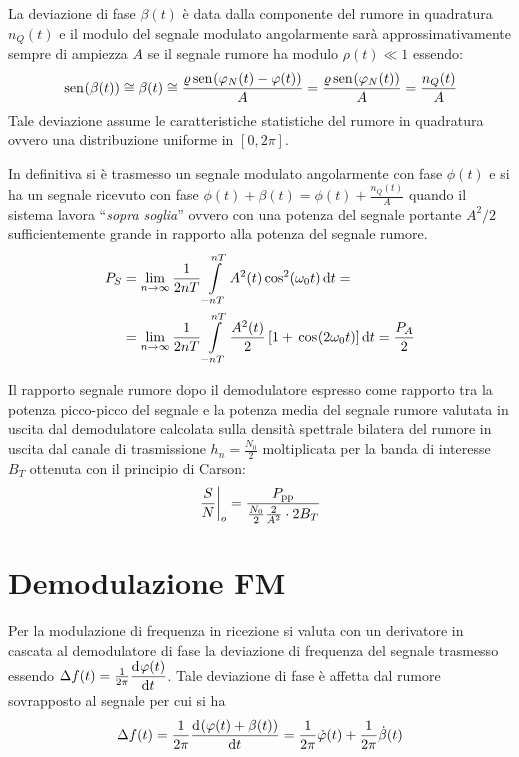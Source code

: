 La deviazione di fase $\beta(t)$ è data dalla componente del rumore in quadratura $n_Q(t)$ e il modulo del segnale modulato angolarmente sarà approssimativamente sempre di ampiezza $A$ se il segnale rumore ha modulo $\rho(t)\ll 1$ essendo:
\[\sen{\beta(t)}\cong\beta(t)\cong\frac{\rho\sen{\phi_N(t)-\phi(t)}}{A}=\frac{\rho\sen{\phi_N(t)}}{A}=\frac{n_Q(t)}{A}\]
Tale deviazione assume le caratteristiche statistiche del rumore in quadratura ovvero una distribuzione uniforme in $[0,2\pi]$.

In definitiva si è trasmesso un segnale modulato angolarmente con fase $\phi(t)$ e si ha un segnale ricevuto con fase $\phi(t)+\beta(t)=\phi(t)+\tfrac{n_Q(t)}{A}$ quando il sistema lavora “\emph{sopra soglia}” ovvero con una potenza del segnale portante $A^2/2$ sufficientemente grande in rapporto alla potenza del segnale rumore.
\begin{equation}\begin{split}
P_S&=\lim\limits_{n\to\infty}{\frac{1}{2 n T}\intd{-n T}{n T}{A^2(t)\cos[2]{\omega_0 t}}{t}}=\\
&=\lim\limits_{n\to\infty}{\frac{1}{2 n T}\intd{-n T}{n T}{\frac{A^2(t)}{2}\left[1+\cos{2\omega_0 t}\right]}{t}}=\frac{P_A}{2}
\end{split}\end{equation}

Il rapporto segnale rumore dopo il demodulatore espresso come rapporto tra la potenza picco-picco del segnale e la potenza media del segnale rumore valutata in uscita dal demodulatore calcolata sulla densità spettrale bilatera del rumore in uscita dal canale di trasmissione $h_n=\frac{N_0}{2}$ moltiplicata per la banda di interesse $B_T$ ottenuta con il principio di Carson:
\begin{equation}
\restrict{\frac{S}{N}}{o}=\frac{P_\text{pp}}{\frac{N_0}{2}\frac{2}{A^2}\cdot 2B_T}
\end{equation}

\section{Demodulazione FM}
Per la modulazione di frequenza in ricezione si valuta con un derivatore in cascata al demodulatore di fase la deviazione di frequenza del segnale trasmesso essendo $\Delta f(t)=\frac{1}{2\pi}\deriv{\phi(t)}{t}$. Tale deviazione di fase è affetta dal rumore sovrapposto al segnale per cui si ha
\[\Delta f(t)=\frac{1}{2\pi}\deriv{(\phi(t)+\beta(t))}{t}=\frac{1}{2\pi}\dot{\phi}(t)+\frac{1}{2\pi}\dot{\beta}(t)\]

